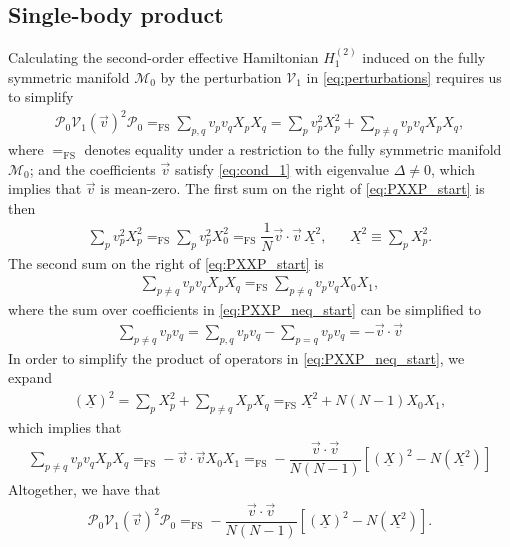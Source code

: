 \documentclass[nofootinbib,notitlepage,11pt]{revtex4-2}
\newcommand{\f}[2]{\dfrac{#1}{#2}} %
\newcommand{\p}[1]{\left(#1\right)} %
\renewcommand{\sp}[1]{\left[#1\right]} %
\renewcommand{\c}{\cdot} %
\renewcommand{\v}{\vec} %
\newcommand{\1}{\mathds{1}}
\newcommand{\M}{\mathcal{M}}
\renewcommand{\P}{\mathcal{P}}
\newcommand{\V}{\mathcal{V}}
\newcommand{\EQFS}{=_{\text{FS}}}
\newcommand{\col}{\underline}
\begin{document}
\subsection{Single-body product}
\label{sec:PXXP}

Calculating the second-order effective Hamiltonian $H_1^{(2)}$ induced
on the fully symmetric manifold $\M_0$ by the perturbation $\V_1$ in
\eqref{eq:perturbations} requires us to simplify
\begin{align}
  \P_0 \V_1\p{\v v}^2 \P_0
  \EQFS \sum_{p,q} v_p v_q X_p X_q
  = \sum_p v_p^2 X_p^2
  + \sum_{p\ne q} v_p v_q X_p X_q,
  \label{eq:PXXP_start}
\end{align}
where $\EQFS$ denotes equality under a restriction to the fully
symmetric manifold $\M_0$; and the coefficients $\v v$ satisfy
\eqref{eq:cond_1} with eigenvalue $\Delta\ne0$, which implies that
$\v v$ is mean-zero.  The first sum on the right of
\eqref{eq:PXXP_start} is then
\begin{align}
  \sum_p v_p^2 X_p^2
  \EQFS \sum_p v_p^2 X_0^2
  \EQFS \f1N \v v\c\v v\, \col{X^2},
  &&
  \col{X^2} \equiv \sum_p X_p^2.
  \label{eq:PXXP_eq}
\end{align}
The second sum on the right of \eqref{eq:PXXP_start} is
\begin{align}
  \sum_{p\ne q} v_p v_q X_p X_q
  \EQFS \sum_{p\ne q} v_p v_q X_0 X_1,
  \label{eq:PXXP_neq_start}
\end{align}
where the sum over coefficients in \eqref{eq:PXXP_neq_start} can be
simplified to
\begin{align}
  \sum_{p\ne q} v_p v_q
  = \sum_{p,q} v_p v_q - \sum_{p=q} v_p v_q
  = - \v v\c\v v
\end{align}
In order to simplify the product of operators in
\eqref{eq:PXXP_neq_start}, we expand
\begin{align}
  \p{\col{X}}^2
  = \sum_p X_p^2 + \sum_{p\ne q} X_p X_q
  \EQFS \col{X^2} + N \p{N-1} X_0 X_1,
  \label{eq:PXXP_neq_ops}
\end{align}
which implies that
\begin{align}
  \sum_{p\ne q} v_p v_q X_p X_q
  \EQFS - \v v\c\v v X_0 X_1
  \EQFS -\f{\v v\c\v v}{N\p{N-1}}
  \sp{\p{\col{X}}^2 - N \p{\col{X^2}}}
  \label{eq:PXXP_neq}
\end{align}
Altogether, we have that
\begin{align}
  \P_0 \V_1\p{\v v}^2 \P_0
  \EQFS -\f{\v v\c\v v}{N\p{N-1}}
  \sp{\p{\col{X}}^2 - N \p{\col{X^2}}}.
\end{align}
\end{document}
